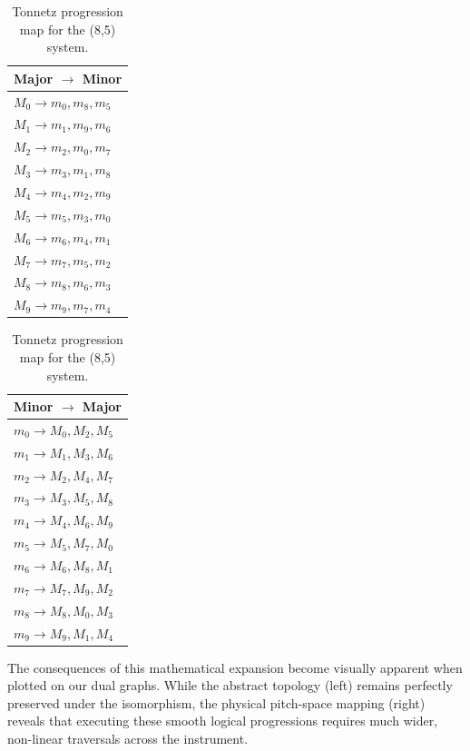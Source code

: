 \documentclass[11pt,letterpaper]{amsart}
\begin{document}
{\tiny \begin{table}[H]
    \centering
    \begin{minipage}{0.48\textwidth}
        \centering
        \begin{tabular}{l}
        \toprule
        \textbf{Major $\to$ Minor} \\
        \midrule
        $M_0 \to m_0, m_8, m_5$ \\
        $M_1 \to m_1, m_9, m_6$ \\
        $M_2 \to m_2, m_0, m_7$ \\
        $M_3 \to m_3, m_1, m_8$ \\
        $M_4 \to m_4, m_2, m_9$ \\
        $M_5 \to m_5, m_3, m_0$ \\
        $M_6 \to m_6, m_4, m_1$ \\
        $M_7 \to m_7, m_5, m_2$ \\
        $M_8 \to m_8, m_6, m_3$ \\
        $M_9 \to m_9, m_7, m_4$ \\
        \bottomrule
        \end{tabular}
    \end{minipage}\hfill
    \begin{minipage}{0.48\textwidth}
        \centering
        \begin{tabular}{l}
        \toprule
        \textbf{Minor $\to$ Major} \\
        \midrule
        $m_0 \to M_0, M_2, M_5$ \\
        $m_1 \to M_1, M_3, M_6$ \\
        $m_2 \to M_2, M_4, M_7$ \\
        $m_3 \to M_3, M_5, M_8$ \\
        $m_4 \to M_4, M_6, M_9$ \\
        $m_5 \to M_5, M_7, M_0$ \\
        $m_6 \to M_6, M_8, M_1$ \\
        $m_7 \to M_7, M_9, M_2$ \\
        $m_8 \to M_8, M_0, M_3$ \\
        $m_9 \to M_9, M_1, M_4$ \\
        \bottomrule
        \end{tabular}
    \end{minipage}
    \caption{Tonnetz progression map for the (8,5) system.}
\end{table}}

The consequences of this mathematical expansion become visually apparent when plotted on our dual graphs. While the abstract topology (left) remains perfectly preserved under the isomorphism, the physical pitch-space mapping (right) reveals that executing these smooth logical progressions requires much wider, non-linear traversals across the instrument.
\end{document}
